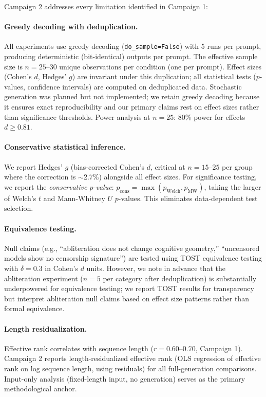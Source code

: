 \documentclass[11pt,a4paper]{article}
\begin{document}
Campaign 2 addresses every limitation identified in Campaign 1:

\paragraph{Greedy decoding with deduplication.} All experiments use greedy decoding (\texttt{do\_sample=False}) with 5 runs per prompt, producing deterministic (bit-identical) outputs per prompt. The effective sample size is $n = 25\text{--}30$ unique observations per condition (one per prompt). Effect sizes (Cohen's $d$, Hedges' $g$) are invariant under this duplication; all statistical tests ($p$-values, confidence intervals) are computed on deduplicated data. Stochastic generation was planned but not implemented; we retain greedy decoding because it ensures exact reproducibility and our primary claims rest on effect sizes rather than significance thresholds. Power analysis at $n = 25$: 80\% power for effects $d \geq 0.81$.

\paragraph{Conservative statistical inference.} We report Hedges' $g$ \citep{hedges1981distribution} (bias-corrected Cohen's $d$, critical at $n = 15$--$25$ per group where the correction is $\sim$2.7\%) alongside all effect sizes. For significance testing, we report the \emph{conservative $p$-value}: $p_{\text{cons}} = \max(p_{\text{Welch}}, p_{\text{MW}})$, taking the larger of Welch's $t$ and Mann-Whitney $U$ $p$-values. This eliminates data-dependent test selection.

\paragraph{Equivalence testing.} Null claims (e.g., ``abliteration does not change cognitive geometry,'' ``uncensored models show no censorship signature'') are tested using TOST equivalence testing \citep{schuirmann1987comparison} with $\delta = 0.3$ in Cohen's $d$ units. However, we note in advance that the abliteration experiment ($n = 5$ per category after deduplication) is substantially underpowered for equivalence testing; we report TOST results for transparency but interpret abliteration null claims based on effect size patterns rather than formal equivalence.

\paragraph{Length residualization.} Effective rank correlates with sequence length ($r = 0.60$--$0.70$, Campaign 1). Campaign 2 reports length-residualized effective rank (OLS regression of effective rank on log sequence length, using residuals) for all full-generation comparisons. Input-only analysis (fixed-length input, no generation) serves as the primary methodological anchor.
\end{document}
